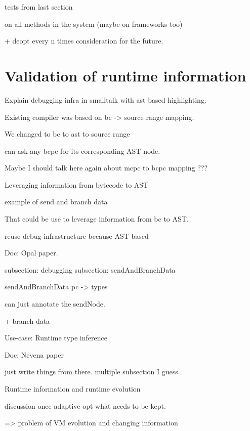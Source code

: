 \documentclass[a4paper,12pt,twoside]{../includes/ThesisStyle}
\begin{document}
tests from last section

on all methods in the system (maybe on frameworks too)

+ deopt every n times consideration for the future.

\section{Validation of runtime information}

Explain debugging infra in smalltalk with ast based highlighting.

Existing compiler was based on bc -> source range mapping.

We changed to bc to ast to source range

can ask any bcpc for its corresponding AST node.

Maybe I should talk here again about mcpc to bcpc mapping ???

Leveraging information from bytecode to AST

example of send and branch data

That could be use to leverage information from bc to AST.

reuse debug infrastructure because AST based

Doc: Opal paper.

subsection: debugging
subsection: sendAndBranchData 

sendAndBranchData pc -> types

can just annotate the sendNode.

+ branch data

Use-case: Runtime type inference

Doc: Nevena paper

just write things from there. multiple subsection I guess

Runtime information and runtime evolution

discussion once adaptive opt what needs to be kept.

=> problem of VM evolution and changing information


\ifx\wholebook\relax\else
    
\end{document}
